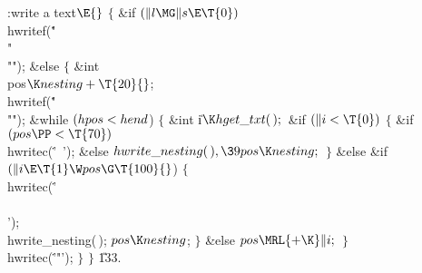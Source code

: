 \writecode
\Y\B\4:write a text\X${}\E{}$\1\6
\4${}\{{}$\5
\&{if} ${}(\|l\MG\|s\E\T{0}){}$\1\5
\\{hwritef}(\.{"\ \\"\\""});\2\6
\&{else}\6
\1${}\{{}$\5
\&{int} \\{pos}${}\K\index{nesting+\\{nesting}}\\{nesting}+\T{20}{}$;\7
\\{hwritef}(\.{"\ \\""});\6
\&{while} ${}(\index{hpos+\\{hpos}}\\{hpos}<\index{hend+\\{hend}}\\{hend}{}$)\6
\1${}\{{}$\5
\&{int} \|i${}\K\index{hget txt+\\{hget\_txt}}\\{hget\_txt}(\,);{}$\7
\&{if} ${}(\|i<\T{0}){}$\5
\1${}\{{}$\6
\&{if} ${}(\index{pos+\\{pos}}\\{pos}\PP<\T{70}){}$\1\5
\\{hwritec}(\.{'\ '});\2\6
\&{else}\1\5
${}\index{hwrite nesting+\\{hwrite\_nesting}}\\{hwrite\_nesting}(\,),\39\index{pos+\\{pos}}\\{pos}\K\index{nesting+\\{nesting}}\\{nesting};{}$\2\6
\4${}\}{}$\2\6
\&{else} \&{if} ${}(\|i\E\T{1}\W\index{pos+\\{pos}}\\{pos}\G\T{100}{}$)\6
\1${}\{{}$\5
\\{hwritec}(\.{'\\\\'});\5
\\{hwrite\_nesting}(\,);\5
${}\index{pos+\\{pos}}\\{pos}\K\index{nesting+\\{nesting}}\\{nesting}{}$;\5
${}\}{}$\2\6
\&{else}\1\5
${}\index{pos+\\{pos}}\\{pos}\MRL{+{\K}}\|i;{}$\2\6
\4${}\}{}$\2\6
\\{hwritec}(\.{'"'});\6
\4${}\}{}$\2\6
\4${}\}{}$\2
\U133.\Y
\fi

